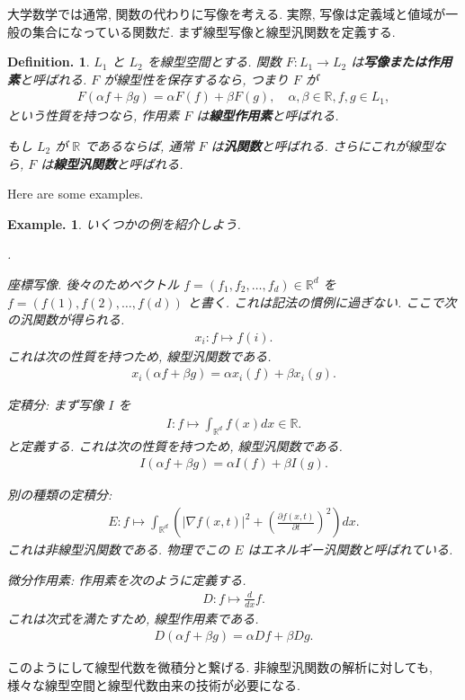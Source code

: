 \documentclass[openany, a4paper, oneside]{jsbook}
\newcounter{enum2}
\renewenvironment{enumerate}{%
\begin{list}%
{%
\arabic{enum2}.\ \,%
}%
{%
\usecounter{enum2}
\setlength{\itemindent}{0pt}%
\setlength{\leftmargin}{15pt}%
\setlength{\rightmargin}{0pt}%
\setlength{\labelsep}{0pt}%
\setlength{\labelwidth}{6pt}%
\setlength{\itemsep}{0pt}%
\setlength{\parsep}{0pt}%
\setlength{\listparindent}{0pt}%
}
}{%
\end{list}%
}
\theoremstyle{break}
\theoremstyle{breakdefn}
\newtheorem{defn}[thm]{Definition.}
\newtheorem{ex}[thm]{Example.}
\newcommand{\abs}[1]{\left|#1\right|}
\newcommand{\rbk}[1]{\left (#1\right)}
\newcommand{\bbR}{\mathbb{R}}
\newcommand{\upbf}[1]{\textup{\textbf{#1}}}
\begin{document}
大学数学では通常, 関数の代わりに写像を考える.
実際, 写像は定義域と値域が一般の集合になっている関数だ.
まず線型写像と線型汎関数を定義する.
\begin{defn}
 $L_1$ と $L_2$ を線型空間とする.
 関数 $F \colon L_1 \to L_2$ は\upbf{写像または作用素}と呼ばれる.
 $F$ が線型性を保存するなら, つまり $F$ が
 \begin{align}
  F \rbk{\alpha f + \beta g}
  =
  \alpha F(f) + \beta F(g), \quad \alpha, \beta \in \bbR, f, g \in L_1,
 \end{align}
 という性質を持つなら, 作用素 $F$ は\upbf{線型作用素}と呼ばれる.

 もし $L_2$ が $\bbR$ であるならば, 通常 $F$ は\upbf{汎関数}と呼ばれる.
 さらにこれが線型なら, $F$ は\upbf{線型汎関数}と呼ばれる.
\end{defn}
Here are some examples.
\begin{ex}
いくつかの例を紹介しよう.
\begin{enumerate}
\item 座標写像.
 後々のためベクトル $f = (f_1, f_2, \dots, f_d) \in \bbR^d$ を $f = (f(1), f(2), \dots, f(d))$ と書く.
 これは記法の慣例に過ぎない.
 ここで次の汎関数が得られる.
 \begin{align}
  x_i \colon f \mapsto f(i).
 \end{align}
 これは次の性質を持つため, 線型汎関数である.
 \begin{align}
  x_i \rbk{\alpha f + \beta g}
  =
  \alpha x_i \rbk{f} + \beta x_i \rbk{g}.
 \end{align}
\item 定積分: まず写像 $I$ を
 \begin{align}
   I \colon
   f \mapsto \int_{\bbR^d} f(x) dx \in \bbR.
 \end{align}
 と定義する.
 これは次の性質を持つため, 線型汎関数である.
 \begin{align}
  I \rbk{\alpha f + \beta g}
  =
  \alpha I \rbk{f} + \beta I \rbk{g}.
 \end{align}
\item 別の種類の定積分:
 \begin{align}
  E \colon
  f \mapsto \int_{\bbR^d} \rbk{\abs{\nabla f(x, t)}^2 + \rbk{\frac{\partial f(x, t)}{\partial t}}^2} dx. \label{linear-algebra-and-calculus-4}
 \end{align}
 これは非線型汎関数である.
 物理でこの $E$ はエネルギー汎関数と呼ばれている.
\item 微分作用素: 作用素を次のように定義する.
 \begin{align}
  D \colon f \mapsto \frac{d}{dx} f.
 \end{align}
 これは次式を満たすため, \textup{線型作用素}である.
 \begin{align}
  D \rbk{\alpha f + \beta g}
  =
  \alpha Df + \beta Dg.
 \end{align}
\end{enumerate}
\end{ex}
このようにして線型代数を微積分と繋げる.
非線型汎関数の解析に対しても, 様々な線型空間と線型代数由来の技術が必要になる.
\end{document}
